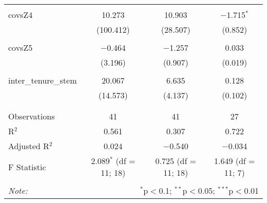 \begin{table}[!htbp]
\begin{tabular}{@{\extracolsep{5pt}}lccc}
  & & & \\ 
 covsZ4 & 10.273 & 10.903 & $-$1.715$^{*}$ \\ 
  & (100.412) & (28.507) & (0.852) \\ 
  & & & \\ 
 covsZ5 & $-$0.464 & $-$1.257 & 0.033 \\ 
  & (3.196) & (0.907) & (0.019) \\ 
  & & & \\ 
 inter\_tenure\_stem & 20.067 & 6.635 & 0.128 \\ 
  & (14.573) & (4.137) & (0.102) \\ 
  & & & \\ 
\hline \\[-1.8ex] 
Observations & 41 & 41 & 27 \\ 
R$^{2}$ & 0.561 & 0.307 & 0.722 \\ 
Adjusted R$^{2}$ & 0.024 & $-$0.540 & $-$0.034 \\ 
F Statistic & 2.089$^{*}$ (df = 11; 18) & 0.725 (df = 11; 18) & 1.649 (df = 11; 7) \\ 
\hline 
\hline \\[-1.8ex] 
\textit{Note:}  & \multicolumn{3}{r}{$^{*}$p$<$0.1; $^{**}$p$<$0.05; $^{***}$p$<$0.01} \\ 
\end{tabular} 
\end{table} 
